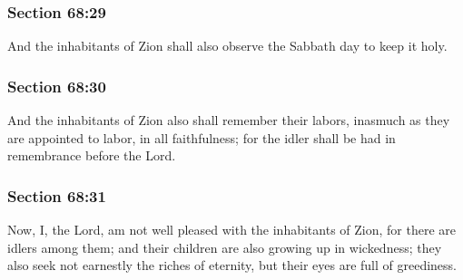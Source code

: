 	\subsubsection{Section 68:29} %
		\label{DC68-29}

		And the inhabitants of Zion shall also observe the Sabbath day to keep it holy.


	\subsubsection{Section 68:30} %
		\label{DC68-30}

		And the inhabitants of Zion also shall remember their labors, inasmuch as they are appointed to labor, in all faithfulness; for the idler shall be had in remembrance before the Lord.


	\subsubsection{Section 68:31} %
		\label{DC68-31}

		Now, I, the Lord, am not well pleased with the inhabitants of Zion, for there are idlers among them; and their children are also growing up in wickedness; they also seek not earnestly the riches of eternity, but their eyes are full of greediness.


